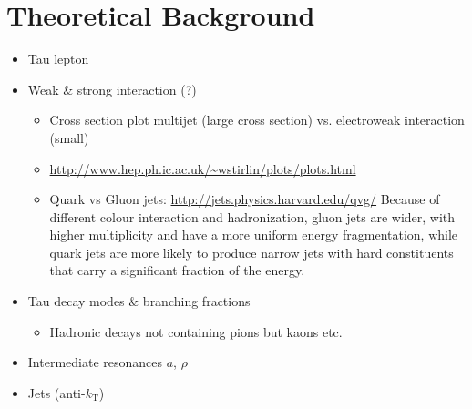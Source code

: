 \chapter{Theoretical Background}
\label{sec:theory}

\begin{itemize}
\item Tau lepton

\item Weak \& strong interaction (?)
  \begin{itemize}
  \item Cross section plot multijet (large cross section) vs.
    electroweak interaction (small)
  \item \url{http://www.hep.ph.ic.ac.uk/~wstirlin/plots/plots.html}
  \item Quark vs Gluon jets: \url{http://jets.physics.harvard.edu/qvg/}
    Because of different colour interaction and hadronization, gluon jets are
    wider, with higher multiplicity and have a more uniform energy
    fragmentation, while quark jets are more likely to produce narrow jets with
    hard constituents that carry a significant fraction of the energy.
  \end{itemize}

\item Tau decay modes \& branching fractions
  \begin{itemize}
  \item Hadronic decays not containing pions but kaons etc.
  \end{itemize}

\item Intermediate resonances $a$, $\rho$

\item Jets (anti-$k_\mathrm{T}$)

\end{itemize}
